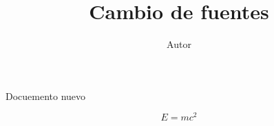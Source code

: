 \documentclass[a4paper,11pt]{article}
\title{Cambio de fuentes}
\author{Autor}
\begin{document}
\maketitle

Docuemento nuevo


\begin{equation}
E = mc^2
\end{equation}
\end{document}
